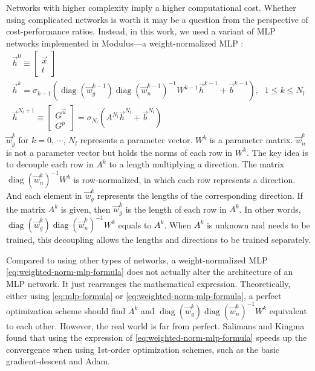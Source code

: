 Networks with higher complexity imply a higher computational cost.
Whether using complicated networks is worth it may be a question from the perspective of cost-performance ratios.
Instead, in this work, we used a variant of MLP networks implemented in Modulus---a weight-normalized MLP \cite{salimans_weight_2016}:
\begin{equation}\label{eq:weighted-norm-mlp-formula}
    \begin{array}{ll}
        \vec{h}^0 \equiv \begin{bmatrix} \vec{x} \\ t \end{bmatrix} & \\
        \vec{h}^k = \sigma_{k-1}\left(
            \operatorname{diag}\left(\vec{w}_g^{k-1}\right)
            \operatorname{diag}\left(\vec{w}_n^{k-1}\right)^{-1}
            W^{k-1}\vec{h}^{k-1}+\vec{b}^{k-1}
        \right)\text{,} & 1 \le k \le N_l \\
        \vec{h}^{N_l+1}\equiv \begin{bmatrix} G^{\vec{u}} \\ G^p \end{bmatrix} = \sigma_{N_l}\left(A^{N_l}\vec{h}^{N_l}+\vec{b}^{N_l}\right) &
    \end{array}
\end{equation}
$\vec{w}_g^{k}$ for $k=0$, $\cdots$, $N_l$ represents a parameter vector.
$W^k$ is a parameter matrix.
$\vec{w}_n^{k}$ is not a parameter vector but holds the norms of each row in $W^k$.
The key idea is to decouple each row in $A^k$ to a length multiplying a direction.
The matrix $\operatorname{diag}\left(\vec{w}_n^k\right)^{-1}W^k$ is row-normalized, in which each row represents a direction.
And each element in $\vec{w}_g^k$ represents the lengths of the corresponding direction.
If the matrix $A^k$ is given, then $\vec{w}_g^k$ is the length of each row in $A^k$.
In other words, $\operatorname{diag}\left(\vec{w}_g^{k}\right) \operatorname{diag}\left(\vec{w}_n^{k}\right)^{-1} W^{k}$ equals to $A^k$.
When $A^k$ is unknown and needs to be trained, this decoupling allows the lengths and directions to be trained separately.

Compared to using other types of networks, a weight-normalized MLP \eqref{eq:weighted-norm-mlp-formula} does not actually alter the architecture of an MLP network.
It just rearranges the mathematical expression.
Theoretically, either using \eqref{eq:mlp-formula} or \eqref{eq:weighted-norm-mlp-formula}, a perfect optimization scheme should find $A^k$ and $\operatorname{diag}\left(\vec{w}_g^{k}\right) \operatorname{diag}\left(\vec{w}_n^{k}\right)^{-1} W^{k}$ equivalent to each other.
However, the real world is far from perfect.
Salimans and Kingma \cite{salimans_weight_2016} found that using the expression of \eqref{eq:weighted-norm-mlp-formula} speeds up the convergence when using 1st-order optimization schemes, such as the basic gradient-descent and Adam.


